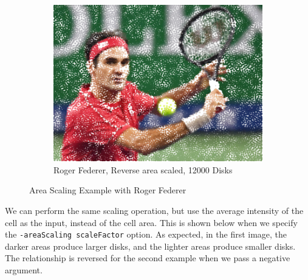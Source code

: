 \documentclass[11pt]{article}
\begin{document}
\begin{figure}[H]
\begin{subfigure}[b]{.48\linewidth}
		\includegraphics[width=\linewidth]{Roger-Federer-ReverseAreaScaling-12000}
		\caption{Roger Federer, Reverse area scaled, 12000 Disks}
		\label{fig:rf3}
	\end{subfigure}
	\caption{Area Scaling Example with Roger Federer}
	\label{fig:rf4}
\end{figure}

We can perform the same scaling operation, but use the average intensity of the cell as the input, instead of the cell area. This is shown below when we specify the \verb|-areaScaling scaleFactor| option. As expected, in the first image, the darker areas produce larger disks, and the lighter areas produce smaller disks. The relationship is reversed for the second example when we pass a negative argument.
\end{document}
